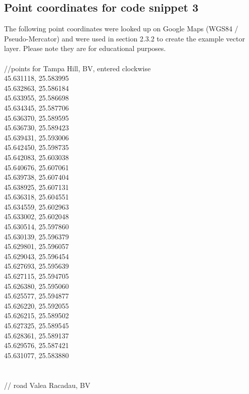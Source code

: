 \documentclass {article}
\begin{document}
\begin{appendices}
\section {Point coordinates for code snippet 3}
The following point coordinates were looked up on Google Maps (WGS84 / Pseudo-Mercator) and were used in section 2.3.2 to create the example vector layer. Please note they are for educational purposes.
\\
\\
//points for Tampa Hill, BV, entered clockwise\\
45.631118, 25.583995\\
45.632863, 25.586184\\
45.633955, 25.586698\\
45.634345, 25.587706\\
45.636370, 25.589595\\
45.636730, 25.589423\\
45.639431, 25.593006\\
45.642450, 25.598735\\
45.642083, 25.603038\\
45.640676, 25.607061\\
45.639738, 25.607404\\
45.638925, 25.607131\\
45.636318, 25.604551\\
45.634559, 25.602963\\
45.633002, 25.602048\\
45.630514, 25.597860\\
45.630139, 25.596379\\
45.629801, 25.596057\\
45.629043, 25.596454\\
45.627693, 25.595639\\
45.627115, 25.594705\\
45.626380, 25.595060\\
45.625577, 25.594877\\
45.626220, 25.592055\\
45.626215, 25.589502\\
45.627325, 25.589545\\
45.628361, 25.589137\\
45.629576, 25.587421\\
45.631077, 25.583880\\
\\
\\
// road Valea Racadau, BV\\

\end{appendices}
\end{document}
